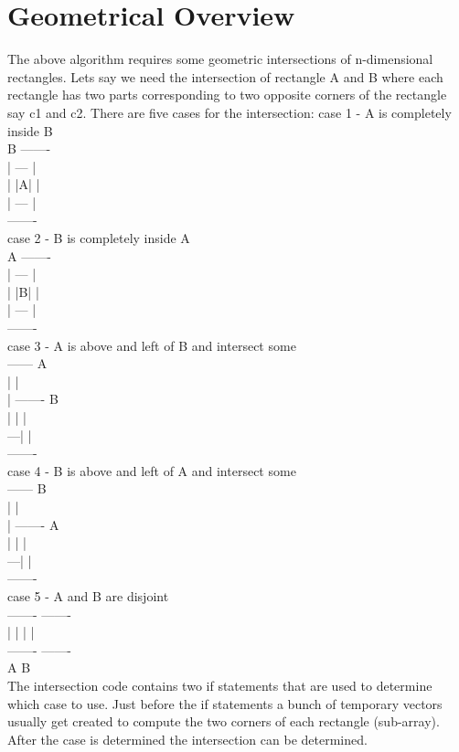 \section*{Geometrical Overview}
The above algorithm requires some geometric intersections of 
n-dimensional rectangles.  Lets say we need the intersection of
rectangle A and B where each rectangle has two parts corresponding
to two opposite corners of the rectangle say c1 and c2.  There
are five cases for the intersection:
case 1 - A is completely inside B\\
B -------\\
  | --- |\\
  | |A| |\\
  | --- |\\
  -------\\
case 2 - B is completely inside A\\
A -------\\
  | --- |\\
  | |B| |\\
  | --- |\\
  -------\\
case 3 - A is above and left of B and intersect some\\
------  A\\
|    |\\
|  -------  B\\
|  |     |\\
---|     |\\
   -------\\
case 4 - B is above and left of A and intersect some\\
------  B\\
|    |\\
|  -------  A\\
|  |     |\\
---|     |\\
   -------\\
case 5 - A and B are disjoint\\
-------   -------\\
|     |   |     |\\
-------   -------\\
   A         B\\
The intersection code contains two if statements that are used to determine
which case to use.  Just before the if statements a bunch of temporary vectors
usually get created to compute the two corners of each rectangle (sub-array).
After the case is determined the intersection can be determined.

